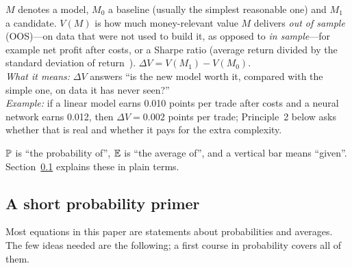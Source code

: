 \begin{description}[leftmargin=1.5em,style=nextline,itemsep=4pt]
\item[Models]
  $M$ denotes a model, $M_0$ a baseline (usually the simplest reasonable one) and $M_1$ a candidate.
  $V(M)$ is how much money-relevant value $M$ delivers \emph{out of sample} (OOS)---on data that were
  not used to build it, as opposed to \emph{in sample}---for example net profit after costs, or a Sharpe ratio (average return divided
  by the standard deviation of return~\citep{sharpe1994}). $\Delta V = V(M_1) - V(M_0)$.\\
  \emph{What it means:} $\Delta V$ answers ``is the new model worth it, compared with the simple
  one, on data it has never seen?''\\
  \emph{Example:} if a linear model earns 0.010 points per trade after costs and a neural network
  earns 0.012, then $\Delta V = 0.002$ points per trade; Principle~2 below asks whether that is
  real and whether it pays for the extra complexity.

\item[Operators]
  $\P$ is ``the probability of'', $\E$ is ``the average of'', and a vertical bar means ``given''.
  Section~\ref{sec:primer} explains these in plain terms.
\end{description}

\subsection{A short probability primer}
\label{sec:primer}

Most equations in this paper are statements about probabilities and averages. The few ideas needed
are the following; a first course in probability covers all of them.


